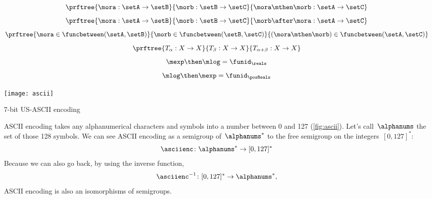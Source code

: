 {\begin{forslides}
    \begin{equation}
      \label{eq:funccomp1}
      \prftree{\mora : \setA \to \setB}{\morb : \setB \to \setC}{\mora \mthen \morb : \setA \to \setC}
    \end{equation}
    \begin{equation}
      \label{eq:funccomp2}
      \prftree{\mora : \setA \to \setB}{\morb : \setB \to \setC}{\morb \after \mora : \setA \to \setC}
    \end{equation}
    \begin{equation}
      \label{eq:funccomp3}
      \prftree{%
        \mora \in \funcbetween(\setA, \setB)}{%
        \morb \in \funcbetween( \setB, \setC)}{
        (\mora \mthen \morb) \in \funcbetween( \setA, \setC)}
    \end{equation}
    \begin{equation}
      \label{eq:transitions}
      \prftree{T_\alpha: X \to X }{T_\beta : X \to X}{T_{\alpha+\beta} : X \to X}
    \end{equation}
    \begin{equation}
      \label{eq:explogid}
      \mexp \then \mlog = \funid_{\reals}
    \end{equation}
    \begin{equation}
      \label{eq:logexpid}
      \mlog \then \mexp = \funid_{\posReals}
    \end{equation}
  \end{forslides}
}%

\begin{marginfigure}
  \texttt{[image: ascii]}
  \caption{7-bit US-ASCII encoding }
  \label{fig:ascii}
\end{marginfigure}

\begin{example}
  ASCII encoding takes any alphanumerical characters and symbols into a number between 0 and 127 (\cref{fig:ascii}).
  Let's call~$\alphanums$ the set of those 128 symbols.
  We can see ASCII encoding as a semigroup \whomo of~$\alphanums^*$ to the free semigroup on the integers~$[0,127]^*$:
  \begin{equation*}
    \label{eq:ASCII-semi}
    \asciienc\colon \alphanums^* \to  [0,127]^*
  \end{equation*}
  Because we can also go back, by using the inverse function,
  \begin{equation*}
    \label{eq:ASCII-semi-inv}
    \asciienc^{-1}\colon  [0,127]^*  \to  \alphanums^*,
  \end{equation*}
  ASCII encoding is also an isomorphisms of semigroups.
\end{example}


